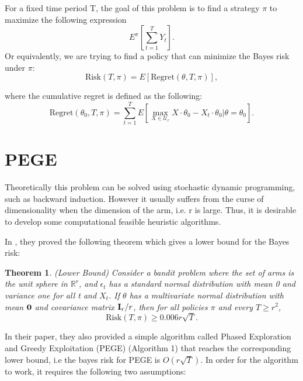 \documentclass{article}
\newtheorem{theorem}{Theorem}
\theoremstyle{plain}
\theoremstyle{definition}
\begin{document}
For a fixed time period T, the goal of this problem is to find a strategy $\pi$ to maximize the following expression
\begin{equation}
E^{\pi}\left[\sum_{t=1}^{T} Y_{t}\right].
\end{equation}
Or equivalently, we are trying to find a policy that can minimize the Bayes risk under $\pi$:
\begin{equation}
\text{Risk}(T,\pi) = E\left[\text{Regret}(\theta,T,\pi)\right],
\end{equation}

where the cumulative regret is defined as the following:
\begin{equation}
\text{Regret}(\theta_{0},T,\pi)=\sum_{t=1}^{T}E\left[\max_{X\in \mathcal{U}_{r}}X\cdot\theta_{0}-X_{t}\cdot \theta_{0}|\theta=\theta_{0}\right].
\end{equation}





\section{PEGE}

Theoretically this problem can be solved using stochastic dynamic programming, such as backward induction. However it usually suffers from the curse of dimensionality when the dimension of the arm, i.e. r is large. Thus, it is desirable to develop some computational feasible heuristic algorithms.

In \cite{Paat}, they proved the following theorem which gives a lower bound for the Bayes risk:

\begin{theorem}(Lower Bound)
Consider a bandit problem where the set of arms is the unit sphere in $\mathbb{R}^{r}$, and $\epsilon_{t}$ has a standard normal distribution with mean 0 and variance one for all t and $X_{t}$. If $\theta$ has a multivariate normal distribution with mean $\bold{0}$ and covariance matrix $\bold{I}_{r}/r$, then for all policies $\pi$ and every $T\geq r^{2}$,
\begin{equation}
\text{Risk}(T,\pi)\geq 0.006r\sqrt{T}. \nonumber 
\end{equation}
\end{theorem}

In their paper, they also provided a simple algorithm called Phased Exploration and Greedy Exploitation (PEGE) (Algorithm 1) that reaches the corresponding lower bound, i.e the bayes risk for PEGE is $O(r\sqrt{T})$. In order for the algorithm to work, it requires the following two assumptions:
\end{document}
